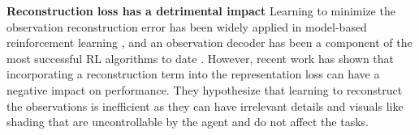 \documentclass{article}
\theoremstyle{plain}
\theoremstyle{definition}
\theoremstyle{remark}
\newcommand{\our}{\textsc{iQRL}\xspace}
\begin{document}






\textbf{Reconstruction loss has a detrimental impact}
Learning to minimize the observation reconstruction error has been widely applied in model-based reinforcement learning \cite{sutton2018reinforcement, haRecurrentWorldModels2018, hafnerLearning2019}, and an observation decoder has been a component of the most successful RL algorithms to date \cite{hafner2023mastering}. However, recent work \citep{zhaoSimplifiedTemporalConsistency2023,hansenTemporalDifferenceLearning2022}
has shown that incorporating a reconstruction term into the representation loss can have a negative impact on performance. They hypothesize that learning to reconstruct the observations is inefficient as they can have irrelevant details and visuals like shading that are uncontrollable by the agent and do not affect the tasks.
\end{document}
